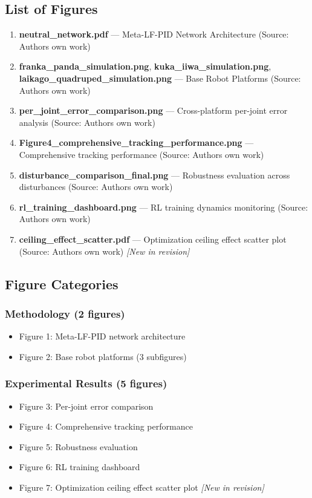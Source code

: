 \documentclass[a4paper,fleqn]{article}
\begin{document}
\subsection{List of Figures}
\begin{enumerate}
    \item \textbf{neutral\_network.pdf} --- Meta-LF-PID Network Architecture (Source: Authors own work)
    \item \textbf{franka\_panda\_simulation.png}, \textbf{kuka\_iiwa\_simulation.png}, \textbf{laikago\_quadruped\_simulation.png} --- Base Robot Platforms (Source: Authors own work)
    \item \textbf{per\_joint\_error\_comparison.png} --- Cross-platform per-joint error analysis (Source: Authors own work)
    \item \textbf{Figure4\_comprehensive\_tracking\_performance.png} --- Comprehensive tracking performance (Source: Authors own work)
    \item \textbf{disturbance\_comparison\_final.png} --- Robustness evaluation across disturbances (Source: Authors own work)
    \item \textbf{rl\_training\_dashboard.png} --- RL training dynamics monitoring (Source: Authors own work)
    \item \textbf{ceiling\_effect\_scatter.pdf} --- Optimization ceiling effect scatter plot (Source: Authors own work) \textit{[New in revision]}
\end{enumerate}

\subsection{Figure Categories}

\subsubsection{Methodology (2 figures)}
\begin{itemize}
    \item Figure 1: Meta-LF-PID network architecture
    \item Figure 2: Base robot platforms (3 subfigures)
\end{itemize}

\subsubsection{Experimental Results (5 figures)}
\begin{itemize}
    \item Figure 3: Per-joint error comparison
    \item Figure 4: Comprehensive tracking performance
    \item Figure 5: Robustness evaluation
    \item Figure 6: RL training dashboard
    \item Figure 7: Optimization ceiling effect scatter plot \textit{[New in revision]}
\end{itemize}
\end{document}
